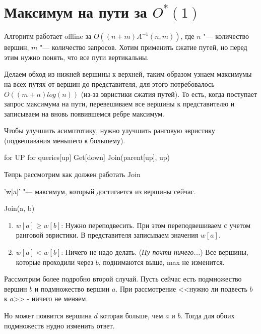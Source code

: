 \chapter{\texorpdfstring{Максимум на пути за $O^*(1)$}{Максимум на пути за $O^*(1)$}}

Алгоритм работает offline за $O((n+m)A^{-1}(n, m))$, где $n$ "--- количество вершин, $m$ "--- количество запросов.
Хотим применить сжатие путей, но перед этим нужно понять, что все пути вертикальны.


Делаем обход из нижней вершины к верхней, таким образом узнаем максимумы на всех путях от вершин до представителя, для этого потребовалось $O((m + n)log(n))$
(из-за эвристики сжатия путей).
То есть, когда поступает запрос максимума на пути, перевешиваем все вершины к представителю и записываем на вновь появившемся ребре максимум. 

Чтобы улучшить асимптотику, нужно улучшить ранговую эвристику (подвешивания меньшего к большему).


\begin{cppcode}
for UP
	for queries[up]
		Get[down]
Join(parent[up], up)
\end{cppcode}

Тепрь рассмотрим как должен работать Join

\cpp'w[a]' "--- максимум, который достигается из вершины сейчас.


Join(a, b)
\begin{enumerate}
\item
	$w[a] \ge w[b]$:
	Нужно переподвесить. При этом переподвешиваем с учетом ранговой эвристики. 
	В представителя записываем значения $w[a]$.

\item
	$w[a] < w[b]$:
	Ничего не надо делать. (\textit{Ну почти ничего...})
	Все вершины, которые проходили через $b$, поднимаются выше, max не изменится.
\end{enumerate}

Рассмотрим более подробно второй случай.
Пусть сейчас есть подмножество вершин $b$ и подмножество вершин $a$.
При рассмотрение <<нужно ли подвесть $b$ к $a$>> - ничего не меняем.

Но может появится вершина $d$ которая больше, чем $a$ и $b$. Тогда для обоих подмножеств нудно изменить ответ.

